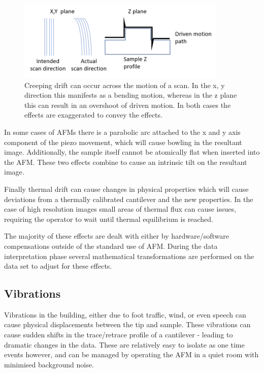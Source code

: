 \begin{figure}[h!]     %
        \begin{center}
          \includegraphics[width=100mm]{chapter2/Creep.PNG}
\end{center}
\caption{Creeping drift can occur across the motion of a scan. In the x, y direction this manifests as a bending motion, whereas in the z plane this can result in an overshoot of driven motion. In both cases the effects are exaggerated to convey the effects.}
\label{fig:Creep}                 %
\end{figure}


In some cases of AFMs there is a parabolic arc attached to the x and y axis component of the piezo movement, which will cause bowling in the resultant image. Additionally, the sample itself cannot be atomically flat when inserted into the AFM. These two effects combine to cause an intrinsic tilt on the resultant image.

Finally thermal drift can cause changes in physical properties which will cause deviations from a thermally calibrated cantilever and the new properties. In the case of high resolution images small areas of thermal flux can cause issues, requiring the operator to wait until thermal equilibrium is reached.

The majority of these effects are dealt with either by hardware/software compensations outside of the standard use of AFM. During the data interpretation phase several mathematical transformations are performed on the data set to adjust for these effects.

\subsection{Vibrations}

Vibrations in the building, either due to foot traffic, wind, or even speech can cause physical displacements between the tip and sample. These vibrations can cause sudden shifts in the trace/retrace profile of a cantilever - leading to dramatic changes in the data. These are relatively easy to isolate as one time events however, and can be managed by operating the AFM in a quiet room with minimised background noise.

